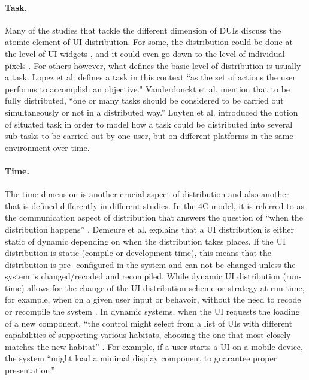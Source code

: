 \paragraph{Task.} Many of the studies that tackle the different dimension of
DUIs discuss the atomic element of UI distribution. For some, the distribution
could be done at the level of UI widgets \cite{vanderdonckt2010distributed}, and
it could even go down to the level of individual pixels \cite{demeure20084c}.
For others however, what defines the basic level of distribution is usually a
task. Lopez et al. \cite{lopez2011formal} defines a task in this context ``as the
set of actions the user performs to accomplish an objective."
Vanderdonckt et al. \cite{vanderdonckt2010distributed} mention that 
to be fully distributed, ``one or many tasks should be considered to be
carried out simultaneously or not in a distributed way.''  Luyten et al.
\cite{luyten2006designing} introduced the notion of situated task in order to model how a task
could be distributed into several sub-tasks to be carried out by one user, but on different platforms in the same environment
over time.

\paragraph{Time.} The time dimension is another crucial aspect of distribution
and also another that is defined differently in different studies. In the 4C
model, it is referred to as the communication aspect of distribution that
answers the question of ``when the distribution happens'' \cite{demeure20084c}.
Demeure et al. explains that a UI distribution is either static of dynamic
depending on when the distribution takes places. If the UI distribution is
static (compile or development time), this means that the distribution is pre-
configured in the system and can not be changed unless the system is
changed/recoded and recompiled. While dynamic UI distribution (run-time) allows
for the change of the UI distribution scheme or strategy at run-time, for
example, when on a given user input or behavoir, without the need to recode or
recompile the system \cite{demeure20084c}. In dynamic systems,
when the UI requests the loading of a new component, ``the control might select
from a list of UIs with different capabilities of supporting various habitats,
choosing the one that most closely matches the new habitat'' \cite{demeure20084c}.
For example, if a user starts a UI on a mobile device, the system ``might
load a minimal display component to guarantee proper presentation.'' \cite{demeure20084c}\\

